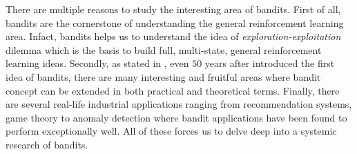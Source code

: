 There are multiple reasons to study the interesting area of bandits. First of all, bandits are the cornerstone of understanding the general reinforcement learning area. Infact, bandits helps us to understand the idea of \textit{exploration-exploitation} dilemma which is the basis to build full, multi-state, general reinforcement learning ideas. Secondly, as stated in \citet{maillard2011apprentissage}, even $50$ years after \cite{robbins1952some} introduced the first idea of bandits, there are many interesting and fruitful areas where bandit concept can be extended in both practical and theoretical terms. Finally, there are several real-life industrial applications ranging from recommendation systems, game theory to anomaly detection where bandit applications have been found to perform exceptionally well. All of these forces us to delve deep into a systemic research of bandits.
